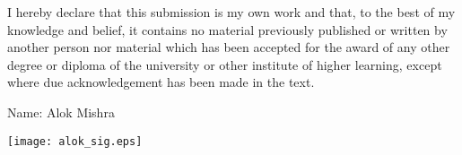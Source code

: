 \begin{declaration}

I hereby declare that this submission is my own work and that, to the best of my knowledge and belief, it contains no material previously published or written by another person nor material which has been accepted for the award of any other degree or diploma of the university or other institute of higher learning, except where due acknowledgement has been made in the text.

\vspace{1in}
Name: Alok Mishra
\vspace{0.2in}

\raisebox{0.15in}{Signature:} \texttt{[image: alok\_sig.eps]} \hspace{2.5in}  \raisebox{0.15in}{Date: 26 September 2011}

\end{declaration}

